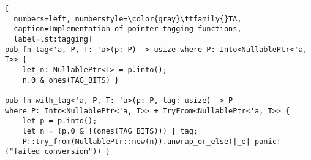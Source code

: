 \begin{lstlisting}[
  numbers=left, numberstyle=\color{gray}\ttfamily{}TA,
  caption=Implementation of pointer tagging functions,
  label=lst:tagging]
pub fn tag<'a, P, T: 'a>(p: P) -> usize where P: Into<NullablePtr<'a, T>> {
    let n: NullablePtr<T> = p.into();
    n.0 & ones(TAG_BITS) }

pub fn with_tag<'a, P, T: 'a>(p: P, tag: usize) -> P
where P: Into<NullablePtr<'a, T>> + TryFrom<NullablePtr<'a, T>> {
    let p = p.into();
    let n = (p.0 & !(ones(TAG_BITS))) | tag;
    P::try_from(NullablePtr::new(n)).unwrap_or_else(|_e| panic!("failed conversion")) }


\end{lstlisting}

